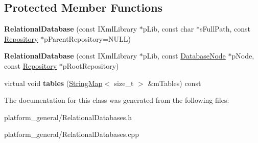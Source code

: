 \subsection*{\-Protected \-Member \-Functions}
\begin{DoxyCompactItemize}
\item 
\hypertarget{classgeneral__server_1_1RelationalDatabase_a4046640732220542c3bbcec27f98eb1b}{{\bfseries \-Relational\-Database} (const \-I\-Xml\-Library $\ast$p\-Lib, const char $\ast$s\-Full\-Path, const \hyperlink{classgeneral__server_1_1Repository}{\-Repository} $\ast$p\-Parent\-Repository=\-N\-U\-L\-L)}\label{classgeneral__server_1_1RelationalDatabase_a4046640732220542c3bbcec27f98eb1b}

\item 
\hypertarget{classgeneral__server_1_1RelationalDatabase_a31190287dafeec8cf101b2fede055e7a}{{\bfseries \-Relational\-Database} (const \-I\-Xml\-Library $\ast$p\-Lib, const \hyperlink{classgeneral__server_1_1DatabaseNode}{\-Database\-Node} $\ast$p\-Node, const \hyperlink{classgeneral__server_1_1Repository}{\-Repository} $\ast$p\-Root\-Repository)}\label{classgeneral__server_1_1RelationalDatabase_a31190287dafeec8cf101b2fede055e7a}

\item 
\hypertarget{classgeneral__server_1_1RelationalDatabase_a65afe46e64317d34c4fbc20727657238}{virtual void {\bfseries tables} (\hyperlink{classgeneral__server_1_1StringMap}{\-String\-Map}$<$ size\-\_\-t $>$ \&m\-Tables) const }\label{classgeneral__server_1_1RelationalDatabase_a65afe46e64317d34c4fbc20727657238}

\end{DoxyCompactItemize}


\-The documentation for this class was generated from the following files\-:\begin{DoxyCompactItemize}
\item 
platform\-\_\-general/\-Relational\-Databases.\-h\item 
platform\-\_\-general/\-Relational\-Databases.\-cpp\end{DoxyCompactItemize}
